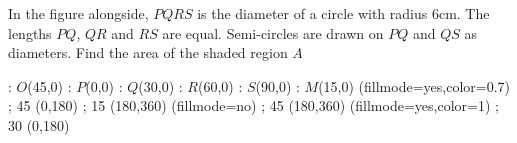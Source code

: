 
%
%
%
%
% 
% 

\question In the figure alongside, $PQRS$ is the diameter of a circle with radius 6cm.
The lengths $PQ$, $QR$ and $RS$ are equal. Semi-circles are drawn on $PQ$ and $QS$ as diameters.
Find the area of the shaded region $A$

\insertQR{}

\ifprintanswers
\fi 
\begin{marginfigure}

    : $O$(45,0)
    : $P$(0,0)
    : $Q$(30,0)
    : $R$(60,0)
    : $S$(90,0)
    : $M$(15,0)
  \figdrawbegin{}
    \figset (fillmode=yes,color=0.7)
     ; 45 (0,180)
     ; 15 (180,360)
    \figset (fillmode=no)
     ; 45 (180,360)
    \figset (fillmode=yes,color=1)
    \figdrawline [101,102,103,104]
     ; 30 (0,180)
  \figdrawend
  \centerline{\box\figBoxA}

\end{marginfigure}


